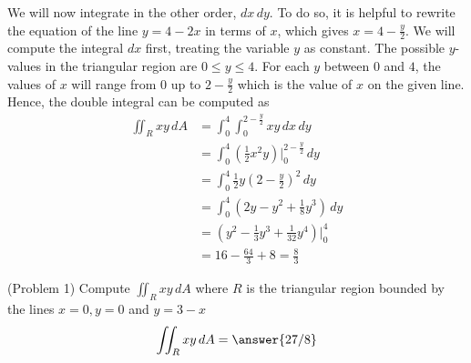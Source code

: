 \documentclass[handout]{ximera}
\begin{document}
\begin{example}[Example 1]
We will now integrate in the other order, $dx \, dy$. To do so, it is helpful to rewrite the equation of the line $y = 4 - 2x$ in terms of $x$, which gives
$x = 4 - \frac{y}{2}$. 
We will compute the integral $dx$ first, treating the variable $y$ as constant. 
The possible $y$-values in the triangular region are $0 \leq y \leq 4$.  
For each $y$ between $0$ and $4$, the values of $x$ will range from $0$ up to $2 - \frac{y}{2}$ which is the value of $x$ on the given line.
Hence, the double integral can be computed as
\begin{align*}
\iint_R xy \, dA & = \int_0^4 \int_0^{2 - \frac{y}{2}} xy \, dx \, dy\\
                 & = \int_0^4 \left(\frac12 x^2y \right) \bigg|_{0}^{2 - \frac{y}{2}} \, dy\\
                 & = \int_0^4 \frac12 y \left(2 - \frac{y}{2}\right)^2 \, dy\\
                 &= \int_0^4 \left(2y - y^2 + \frac18 y^3\right) \, dy\\
                 &= \left(y^2 - \frac13 y^3 + \frac{1}{32} y^4 \right) \bigg|_0^4\\
                 &= 16 - \frac{64}{3} + 8 = \frac83
\end{align*}      

\begin{image}
\end{image}

\end{example}



\begin{problem}(Problem 1)
Compute $\iint_R xy \, dA$ where $R$ is the triangular region bounded by the lines $x = 0, y = 0$ and $y = 3-x$\\
\[
\iint_R xy \, dA = \answer{27/8}
\]
\end{problem}
\end{document}
